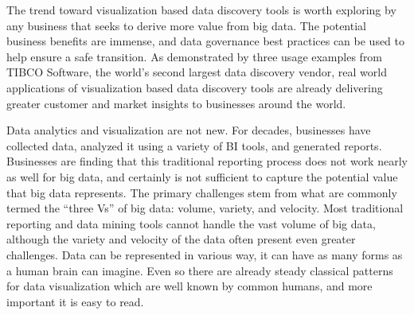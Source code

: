 The trend toward visualization based data discovery tools is worth exploring by any business that seeks to derive more value from big data. The potential business benefits are immense, and data governance best practices can be used to help ensure a safe transition. As demonstrated by three usage examples from TIBCO Software, the world’s second largest data discovery vendor, real world applications of visualization based data discovery tools are already delivering greater customer and market insights to businesses around the world.

Data analytics and visualization are not new. For decades, businesses have collected data, analyzed it using a variety of BI tools, and generated reports. Businesses are finding that this traditional reporting process does not work nearly as well for big data, and certainly is not sufficient to capture the potential value that big data represents. The primary challenges stem from what are commonly termed the “three Vs” of big data: volume, variety, and velocity. Most traditional reporting and data mining tools cannot handle the vast volume of big data, although the variety and velocity of the data often present even greater challenges. Data can be represented in various way, it can have as many forms as a human brain can imagine. Even so there are already steady classical patterns for data visualization which are well known by common humans, and more important it is easy to read.

